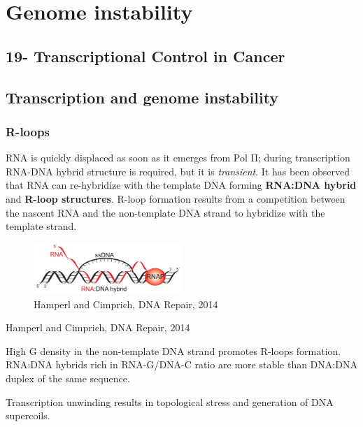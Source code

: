 \graphicspath{{chapters/_resources/}}

\chapter{Genome instability}

\hypertarget{transcriptional-control-in-cancer}{%
\section{19- Transcriptional Control in Cancer}\label{transcriptional-control-in-cancer}}

\hypertarget{transcription-and-genome-instability}{%
\section{Transcription and genome instability}\label{transcription-and-genome-instability}}

\hypertarget{r-loops}{%
\subsection{R-loops}\label{r-loops}}

RNA is quickly displaced as soon as it emerges from Pol II; during transcription RNA-DNA hybrid structure is required, but it is \emph{transient}. It has been observed that RNA can re-hybridize with the template DNA forming \textbf{RNA:DNA hybrid} and \textbf{R-loop structures}. R-loop formation results from a competition between the nascent RNA and the non-template DNA strand to hybridize with the template strand.

\begin{figure}
\centering
\includegraphics[width=0.5\textwidth]{../_resources/Screen_Shot_2022-11-23_at_09-53-33.png}
\caption{Hamperl and Cimprich, DNA Repair, 2014}
\end{figure}

Hamperl and Cimprich, DNA Repair, 2014

High G density in the non-template DNA strand promotes R-loops formation. RNA:DNA hybrids rich in RNA-G/DNA-C ratio are more stable than DNA:DNA duplex of the same sequence.

Transcription unwinding results in topological stress and generation of DNA supercoils.

